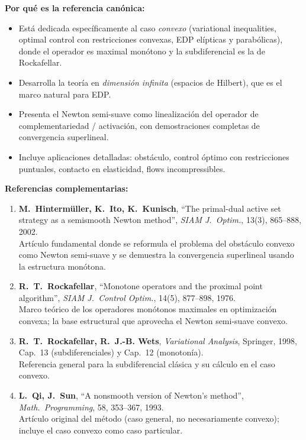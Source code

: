 \documentclass[12pt]{book}
\theoremstyle{definition}
\theoremstyle{plain}
\theoremstyle{remark}
\begin{document}
\medskip

\textbf{Por qué es la referencia canónica:}
\begin{itemize}[leftmargin=1.4em,itemsep=2pt]
  \item Está dedicada específicamente al caso \emph{convexo}
        (variational inequalities, optimal control con restricciones
        convexas, EDP elípticas y parabólicas), donde el operador es
        maximal monótono y la subdiferencial es la de
        Rockafellar.
  \item Desarrolla la teoría en \emph{dimensión infinita}
        (espacios de Hilbert), que es el marco natural para EDP.
  \item Presenta el Newton semi-suave como linealización del
        operador de complementariedad / activación, con
        demostraciones completas de convergencia superlineal.
  \item Incluye aplicaciones detalladas: obstáculo, control
        óptimo con restricciones puntuales, contacto en
        elasticidad, flows incompressibles.
\end{itemize}

\textbf{Referencias complementarias:}

\begin{enumerate}[leftmargin=1.4em,itemsep=2pt]
  \item \textbf{M.~Hintermüller, K.\ Ito, K.\ Kunisch},
        ``The primal-dual active set strategy as a semismooth
        Newton method'',
        \textit{SIAM J.\ Optim.}, 13(3), 865--888, 2002.\\
        Artículo fundamental donde se reformula el problema del
        obstáculo convexo como Newton semi-suave y se demuestra la
        convergencia superlineal usando la estructura monótona.
  \item \textbf{R.\ T.\ Rockafellar},
        ``Monotone operators and the proximal point algorithm'',
        \textit{SIAM J.\ Control Optim.}, 14(5), 877--898, 1976.\\
        Marco teórico de los operadores monótonos maximales en
        optimización convexa; la base estructural que aprovecha el
        Newton semi-suave convexo.
  \item \textbf{R.\ T.\ Rockafellar, R.\ J.-B. Wets},
        \textit{Variational Analysis}, Springer, 1998,
        Cap.\ 13 (subdiferenciales) y Cap.\ 12 (monotonía).\\
        Referencia general para la subdiferencial clásica y su
        cálculo en el caso convexo.
  \item \textbf{L.~Qi, J.~Sun},
        ``A nonsmooth version of Newton's method'',
        \textit{Math.\ Programming}, 58, 353--367, 1993.\\
        Artículo original del método (caso general, no necesariamente
        convexo); incluye el caso convexo como caso particular.
\end{enumerate}
\end{document}
